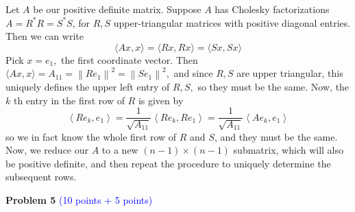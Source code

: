 \documentclass[english,onecolumn]{IEEEtran}
\begin{document}
\begin{enumerate}
	 Let $A$ be our positive definite matrix. Suppose $A$ has Cholesky factorizations $A=R^{*} R=S^{*} S$, for $R, S$ upper-triangular matrices with positive diagonal entries. Then we can write
	$$
	\langle A x, x\rangle=\langle R x, R x\rangle=\langle S x, S x\rangle
	$$
	Pick $x=e_{1},$ the first coordinate vector. Then $\langle A x, x\rangle=A_{11}=\left\|R e_{1}\right\|^{2}=\left\|S e_{1}\right\|^{2},$ and since $R, S$ are upper triangular, this uniquely defines the upper left entry of $R, S,$ so they must be the same. Now, the $k$ th entry in the first row of $R$ is given by
	$$
	\left\langle R e_{k}, e_{1}\right\rangle=\frac{1}{\sqrt{A_{11}}}\left\langle R e_{k}, R e_{1}\right\rangle=\frac{1}{\sqrt{A_{11}}}\left\langle A e_{k}, e_{1}\right\rangle
	$$
	so we in fact know the whole first row of $R$ and $S$, and they must be the same. Now, we reduce our $A$ to a new $(n-1) \times(n-1)$ submatrix, which will also be positive definite, and then repeat the procedure to uniquely determine the subsequent rows. 
	  
    
    
 
\end{enumerate}

\newpage
\noindent\textbf{Problem 5}
\textcolor{blue}{(10 points + 5 points)}
\end{document}
